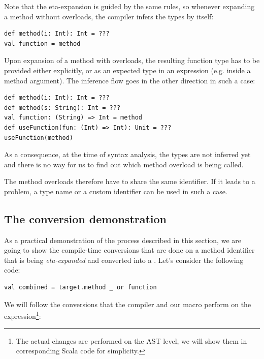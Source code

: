 Note that the eta-expansion is guided by the same rules, so whenever expanding a method without overloads, the compiler infers the types by itself:
\lstset{style=Scala}
\begin{lstlisting}
def method(i: Int): Int = ???
val function = method
\end{lstlisting}

Upon expansion of a method with overloads, the resulting function type has to be provided either explicitly, or as an expected type in an expression (e.g. inside a method argument). The inference flow goes in the other direction in such a case:
\lstset{style=Scala}
\begin{lstlisting}
def method(i: Int): Int = ???
def method(s: String): Int = ???
val function: (String) => Int = method
def useFunction(fun: (Int) => Int): Unit = ???
useFunction(method)
\end{lstlisting}

As a consequence, at the time of syntax analysis, the types are not inferred yet and there is no way for us to find out which method overload is being called.

The method overloads therefore have to share the same identifier. If it leads to a problem, a type name or a custom identifier can be used in such a case.

\subsection{The conversion demonstration}

As a practical demonstration of the process described in this section, we are going to show the compile-time conversions that are done on a method identifier that is being \textit{eta-expanded} and converted into a . Let's consider the following code:

\lstset{style=Scala}
\begin{lstlisting}
val combined = target.method _ or function
\end{lstlisting}

We will follow the conversions that the compiler and our macro perform on the  expression\footnote{The actual changes are performed on the AST level, we will show them in corresponding Scala code for simplicity.}:

